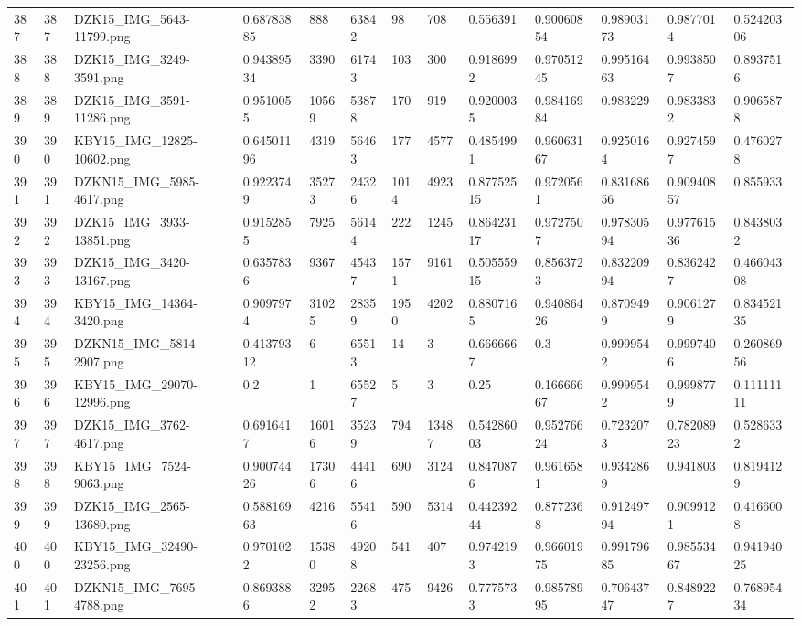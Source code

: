 \documentclass[11pt, a4paper, twoside]{report}
\begin{document}
\begin{longtable}[c]{@{}lllllllllllll@{}}
387 & 387 & DZK15\_IMG\_5643-11799.png & 0.68783885 & 888 & 63842 & 98 & 708 & 0.556391 & 0.90060854 & 0.98903173 & 0.9877014 & 0.52420306 \\
388 & 388 & DZK15\_IMG\_3249-3591.png & 0.94389534 & 3390 & 61743 & 103 & 300 & 0.9186992 & 0.97051245 & 0.99516463 & 0.9938507 & 0.8937516 \\
389 & 389 & DZK15\_IMG\_3591-11286.png & 0.9510055 & 10569 & 53878 & 170 & 919 & 0.9200035 & 0.98416984 & 0.983229 & 0.9833832 & 0.9065878 \\
390 & 390 & KBY15\_IMG\_12825-10602.png & 0.64501196 & 4319 & 56463 & 177 & 4577 & 0.4854991 & 0.96063167 & 0.9250164 & 0.9274597 & 0.4760278 \\
391 & 391 & DZKN15\_IMG\_5985-4617.png & 0.9223749 & 35273 & 24326 & 1014 & 4923 & 0.87752515 & 0.9720561 & 0.83168656 & 0.90940857 & 0.855933 \\
392 & 392 & DZK15\_IMG\_3933-13851.png & 0.9152855 & 7925 & 56144 & 222 & 1245 & 0.86423117 & 0.9727507 & 0.97830594 & 0.97761536 & 0.8438032 \\
393 & 393 & DZK15\_IMG\_3420-13167.png & 0.6357836 & 9367 & 45437 & 1571 & 9161 & 0.50555915 & 0.8563723 & 0.83220994 & 0.8362427 & 0.46604308 \\
394 & 394 & KBY15\_IMG\_14364-3420.png & 0.9097974 & 31025 & 28359 & 1950 & 4202 & 0.8807165 & 0.94086426 & 0.8709499 & 0.9061279 & 0.83452135 \\
395 & 395 & DZKN15\_IMG\_5814-2907.png & 0.41379312 & 6 & 65513 & 14 & 3 & 0.6666667 & 0.3 & 0.9999542 & 0.9997406 & 0.26086956 \\
396 & 396 & KBY15\_IMG\_29070-12996.png & 0.2 & 1 & 65527 & 5 & 3 & 0.25 & 0.16666667 & 0.9999542 & 0.9998779 & 0.11111111 \\
397 & 397 & DZK15\_IMG\_3762-4617.png & 0.6916417 & 16016 & 35239 & 794 & 13487 & 0.54286003 & 0.95276624 & 0.7232073 & 0.78208923 & 0.5286332 \\
398 & 398 & KBY15\_IMG\_7524-9063.png & 0.90074426 & 17306 & 44416 & 690 & 3124 & 0.8470876 & 0.9616581 & 0.9342869 & 0.941803 & 0.8194129 \\
399 & 399 & DZK15\_IMG\_2565-13680.png & 0.58816963 & 4216 & 55416 & 590 & 5314 & 0.44239244 & 0.8772368 & 0.91249794 & 0.9099121 & 0.4166008 \\
400 & 400 & KBY15\_IMG\_32490-23256.png & 0.9701022 & 15380 & 49208 & 541 & 407 & 0.9742193 & 0.96601975 & 0.99179685 & 0.98553467 & 0.94194025 \\
401 & 401 & DZKN15\_IMG\_7695-4788.png & 0.8693886 & 32952 & 22683 & 475 & 9426 & 0.7775733 & 0.98578995 & 0.70643747 & 0.8489227 & 0.76895434 \\

\end{longtable}
\end{document}
